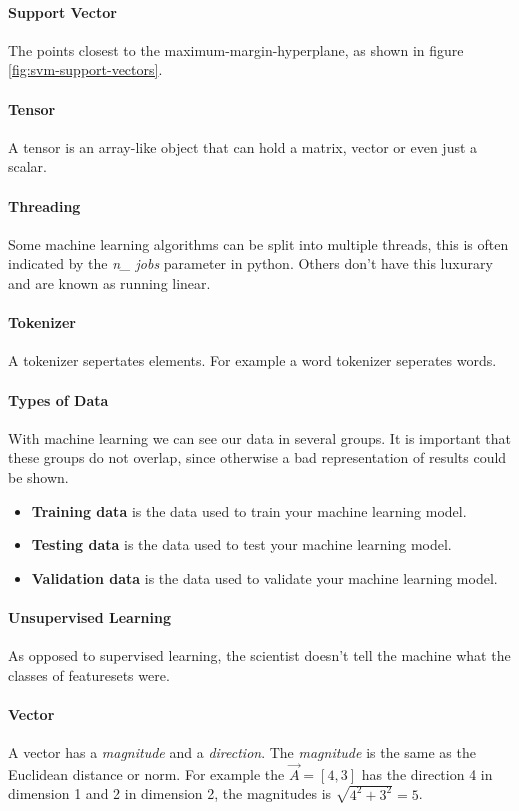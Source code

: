 \paragraph{Support Vector}
The points closest to the maximum-margin-hyperplane, as shown in figure \ref{fig:svm-support-vectors}.

\paragraph{Tensor} 
A tensor is an array-like object that can hold a matrix, vector or even just a scalar.

\paragraph{Threading} 
Some machine learning algorithms can be split into multiple threads, this is often indicated by the \emph{n\_ jobs} parameter in python. Others don't have this luxurary and are known as running linear.

\paragraph{Tokenizer}
A tokenizer sepertates elements. For example a word tokenizer seperates words.

\paragraph{Types of Data} 
With machine learning we can see our data in several groups. It is important that these groups do not overlap, since otherwise a bad representation of results could be shown.
\begin{itemize}
	\item \textbf{Training data} is the data used to train your machine learning model.
	\item \textbf{Testing data} is the data used to test your machine learning model.
	\item \textbf{Validation data} is the data used to validate your machine learning model.
\end{itemize}

\paragraph{Unsupervised Learning}
As opposed to supervised learning, the scientist doesn't tell the machine what the classes of featuresets were.

\paragraph{Vector}
A vector has a \emph{magnitude} and a \emph{direction}. The \emph{magnitude} is the same as the Euclidean distance or norm. For example the $\vec{A} = [4, 3]$ has the direction 4 in dimension 1 and 2 in dimension 2, the magnitudes is $\sqrt{4^2 + 3^2} = 5$. 


 
